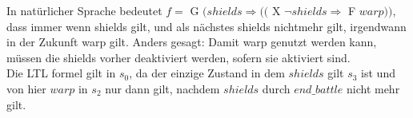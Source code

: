 \documentclass[a4paper,12pt]{scrartcl}
\begin{document}
In natürlicher Sprache bedeutet
$f=$ G $(shields \Rightarrow (($ X $ \neg{shields} \Rightarrow $ F $warp))$,
 dass immer wenn shields gilt, und als nächstes shields nichtmehr gilt, 
irgendwann in der Zukunft warp gilt. Anders gesagt: Damit warp genutzt 
werden kann, müssen die shields vorher deaktiviert werden, sofern sie 
aktiviert sind.\\

Die LTL formel gilt in $s_0$, da der einzige Zustand in dem $shields$ gilt
$s_3$ ist und von hier $warp$ in $s_2$ nur dann gilt, nachdem $shields$ 
durch $end\_battle$ nicht mehr gilt.
\subsubsection{}
\subsection{}
\end{document}
